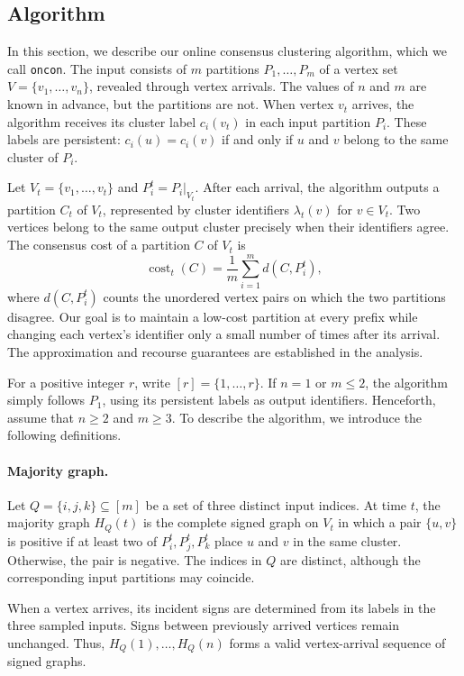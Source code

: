 \documentclass[11pt]{article}
\theoremstyle{definition}
\theoremstyle{remark}
\newcommand{\1}{\mathbf{1}}
\begin{document}
\subsection{Algorithm}
\label{sec:oncon-algorithm}

In this section, we describe our online consensus clustering algorithm,
which we call \texttt{oncon}. The input consists of $m$ partitions
$P_1,\ldots,P_m$ of a vertex set $V=\{v_1,\ldots,v_n\}$, revealed through
vertex arrivals. The values of $n$ and $m$ are known in advance, but the
partitions are not. When vertex $v_t$ arrives, the algorithm receives its
cluster label $c_i(v_t)$ in each input partition $P_i$. These labels are
persistent: $c_i(u)=c_i(v)$ if and only if $u$ and $v$ belong to the same
cluster of $P_i$.

Let $V_t=\{v_1,\ldots,v_t\}$ and $P_i^t=P_i|_{V_t}$. After each arrival,
the algorithm outputs a partition $C_t$ of $V_t$, represented by cluster
identifiers $\lambda_t(v)$ for $v\in V_t$. Two vertices belong to the same
output cluster precisely when their identifiers agree. The consensus
cost of a partition $C$ of $V_t$ is
\[
    \operatorname{cost}_t(C)
    =
    \frac{1}{m}\sum_{i=1}^{m} d(C,P_i^t),
\]
where $d(C,P_i^t)$ counts the unordered vertex pairs on which the two
partitions disagree. Our goal is to maintain a low-cost partition at
every prefix while changing each vertex's identifier only a small
number of times after its arrival. The approximation and recourse
guarantees are established in the analysis.

For a positive integer $r$, write $[r]=\{1,\ldots,r\}$. If $n=1$ or
$m\leq 2$, the algorithm simply follows $P_1$, using its persistent
labels as output identifiers. Henceforth, assume that $n\geq 2$ and
$m\geq 3$. To describe the algorithm, we introduce the following
definitions.

\paragraph{Majority graph.}
Let $Q=\{i,j,k\}\subseteq[m]$ be a set of three distinct input indices.
At time $t$, the majority graph $H_Q(t)$ is the complete signed graph on
$V_t$ in which a pair $\{u,v\}$ is positive if at least two of
$P_i^t,P_j^t,P_k^t$ place $u$ and $v$ in the same cluster. Otherwise,
the pair is negative. The indices in $Q$ are distinct, although the
corresponding input partitions may coincide.

When a vertex arrives, its incident signs are determined from its
labels in the three sampled inputs. Signs between previously arrived
vertices remain unchanged. Thus,
$H_Q(1),\ldots,H_Q(n)$ forms a valid vertex-arrival sequence of signed
graphs.
\end{document}
